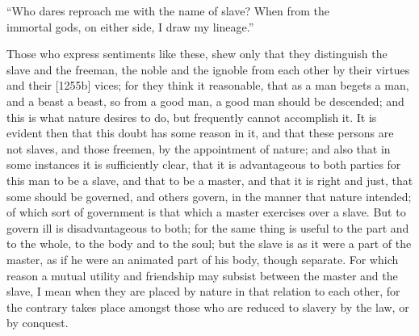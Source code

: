 ``Who dares reproach me with the name of slave? When from the\\
immortal gods, on either side, I draw my lineage.''

Those who express sentiments like these, shew only that they distinguish
the slave and the freeman, the noble and the ignoble from each other by
their virtues and their [1255b] vices; for they think it reasonable, that
as a man begets a man, and a beast a beast, so from a good man, a good man
should be descended; and this is what nature desires to do, but frequently
cannot accomplish it. It is evident then that this doubt has some reason
in it, and that these persons are not slaves, and those freemen, by the
appointment of nature; and also that in some instances it is sufficiently
clear, that it is advantageous to both parties for this man to be a slave,
and that to be a master, and that it is right and just, that some should
be governed, and others govern, in the manner that nature intended; of
which sort of government is that which a master exercises over a slave.
But to govern ill is disadvantageous to both; for the same thing is useful
to the part and to the whole, to the body and to the soul; but the slave
is as it were a part of the master, as if he were an animated part of his
body, though separate. For which reason a mutual utility and friendship
may subsist between the master and the slave, I mean when they are placed
by nature in that relation to each other, for the contrary takes place
amongst those who are reduced to slavery by the law, or by conquest.


